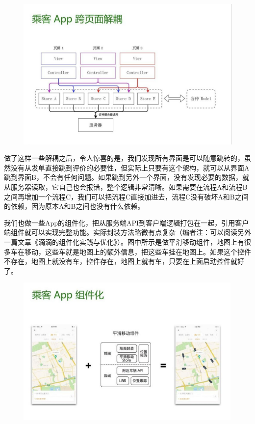 \documentclass[12pt]{article}
\begin{document}
\begin{figure}[H]
    \centering
    \includegraphics[width=1\textwidth]{fig/DIDI_Reconstruction_14.png}
\end{figure}

做了这样一些解耦之后，令人惊喜的是，我们发现所有界面是可以随意跳转的，虽然没有从发单直接跳到评价的必要性，但实际上只要有这个架构，就可以从界面A跳到界面B，不会有任何问题。如果跳到另外一个界面，没有发现必要的数据，就从服务器读取，它自己也会报错，整个逻辑非常清晰。如果需要在流程A和流程B之间再增加一个流程C，我们可以把流程C直接加进去，流程C没有破坏A和B之间的依赖，因为原本A和B之间也没有什么依赖。

我们也做一些App的组件化，把从服务端API到客户端逻辑打包在一起，引用客户端组件就可以实现完整功能。实际封装方法略微有点复杂（编者注：可以阅读另外一篇文章《滴滴的组件化实践与优化》）。图中所示是做平滑移动组件，地图上有很多车在移动，这些车就是地图上的额外信息，把这些车挂在地图上。如果这个控件不存在，地图上就没有车，控件存在，地图上就有车，只要在上面启动控件就好了。

\begin{figure}[H]
    \centering
    \includegraphics[width=1\textwidth]{fig/DIDI_Reconstruction_15.png}
\end{figure}
\end{document}

